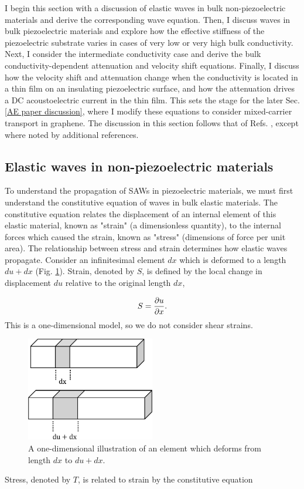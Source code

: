 \documentclass[double,12pt,1in]{beavtex}
\begin{document}
I begin this section with a discussion of elastic waves in bulk non-piezoelectric materials and derive the corresponding wave equation. Then, I discuss waves in bulk piezoelectric materials and explore how the effective stiffness of the piezoelectric substrate varies in cases of very low or very high bulk conductivity. Next, I consider the intermediate conductivity case and derive the bulk conductivity-dependent attenuation and velocity shift equations. Finally, I discuss how the velocity shift and attenuation change when the conductivity is located in a thin film on an insulating piezoelectric surface, and how the attenuation drives a DC acoustoelectric current in the thin film. This sets the stage for the later Sec. \ref{AE paper discussion}, where I modify these equations to consider mixed-carrier transport in graphene. The discussion in this section follows that of Refs. \cite{weinreich_acoustodynamic_1956, hutson_elastic_1962, wixforth_surface_1989}, except where noted by additional references.

\subsection{Elastic waves in non-piezoelectric materials}
To understand the propagation of SAWs in piezoelectric materials, we must first understand the constitutive equation of waves in bulk elastic materials. The constitutive equation relates the displacement of an internal element of this elastic material, known as "strain" (a dimensionless quantity), to the internal forces which caused the strain, known as "stress" (dimensions of force per unit area). The relationship between stress and strain determines how elastic waves propagate. Consider an infinitesimal element $dx$ which is deformed to a length $du + dx$ (Fig. \ref{dfield}). Strain, denoted by $S$, is defined by the local change in displacement $du$ relative to the original length $dx$, 

\begin{equation}
    S = \pdv{u}{x}. \label{strain-displacement equation}
\end{equation}
This is a one-dimensional model, so we do not consider shear strains.
\begin{figure}
    \includegraphics[width = 0.5\textwidth]{displacement field.pdf}
    \caption{A one-dimensional illustration of an element which deforms from length $dx$ to $du + dx$.} \label{dfield}
\end{figure}
Stress, denoted by $T$, is related to strain by the constitutive equation
\end{document}
